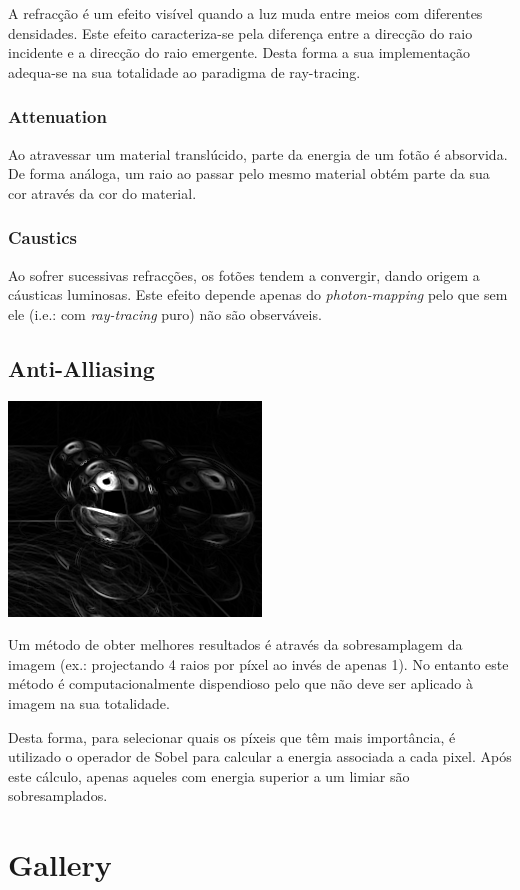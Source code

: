\documentclass[a4paper]{article}
\begin{document}
\indent A refracção é um efeito visível quando a luz muda entre meios com diferentes densidades.
Este efeito caracteriza-se pela diferença entre a direcção do raio incidente e a direcção do raio emergente. 
Desta forma a sua implementação adequa-se na sua totalidade ao paradigma de ray-tracing.

\subsubsection{Attenuation}
\indent \indent Ao atravessar um material translúcido, parte da energia de um fotão é absorvida. De forma análoga,
um raio ao passar pelo mesmo material obtém parte da sua cor através da cor do material.

\subsubsection{Caustics}
\indent \indent Ao sofrer sucessivas refracções, os fotões tendem a convergir, dando origem a cáusticas luminosas.
Este efeito depende apenas do \emph{photon-mapping} pelo que sem ele (i.e.: com \emph{ray-tracing} puro)
não são observáveis.

\cleardoublepage
\subsection{Anti-Alliasing}
\begin{center}
	\includegraphics[scale=0.50]{images/sobel.png}
	\label{fig:sobel}
\end{center}

\indent Um método de obter melhores resultados é através da sobresamplagem da imagem (ex.: projectando
4 raios por píxel ao invés de apenas 1). No entanto este método é computacionalmente dispendioso pelo que não
deve ser aplicado à imagem na sua totalidade.

\indent Desta forma, para selecionar quais os píxeis que têm mais importância, é utilizado o operador de Sobel
para calcular a energia associada a cada pixel. Após este cálculo, apenas aqueles com energia superior a um limiar
são sobresamplados.

\cleardoublepage
\section{Gallery}
\indent \indent 
\end{document}
